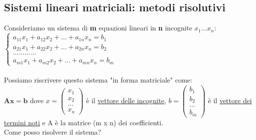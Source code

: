 \documentclass[12pt]{article}
\begin{document}
\subsection{Sistemi lineari matriciali: metodi risolutivi}
Consideriamo un sistema di \textbf{m} equazioni lineari in \textbf{n} incognite $x_1...x_n$:\\
$\begin{cases}
a_{11}x_1+a_{12}x_2+...+a_{1n}x_n = b_1\\
a_{21}x_1+a_{22}x_2+...+a_{2n}x_{n} = b_2\\
............\\
a_{m1}x_1+a_{m2}x_2+...+a_{mn}x_{n} = b_{m}
\end{cases}
$
\\\\
Possiamo riscrivere questo sistema "in forma matriciale" come:\\
$\boldsymbol{Ax = b}$ dove $x = \begin{pmatrix}
    x_1\\
    x_2\\
    ...\\
    x_n
\end{pmatrix}$
è il \underline{vettore delle incognite}, $b = \begin{pmatrix}
    b_1\\
    b_2\\
    ...\\
    b_m
\end{pmatrix}$
è  il \underline{vettore dei termini noti} e A è la matrice (m x n) dei coefficienti.\\
Come posso risolvere il sistema?
\end{document}
